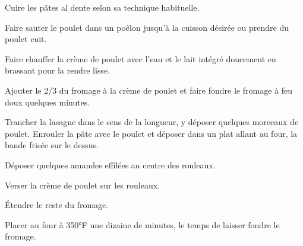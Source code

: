 \begin{steps}
    \item Cuire les pâtes al dente selon sa technique habituelle.
    \item Faire sauter le poulet dans un poêlon jusqu'à la cuisson désirée ou prendre du poulet cuit.
    \item Faire chauffer la crème de poulet avec l'eau et le lait intégré doucement en brassant pour la rendre lisse.
    \item Ajouter le 2/3 du fromage à la crème de poulet et faire fondre le fromage à feu doux quelques minutes.
    \item Trancher la lasagne dans le sens de la longueur, y déposer quelques morceaux de poulet. Enrouler la pâte avec le poulet et déposer dans un plat allant au four, la bande frisée sur le dessus.
    \item Déposer quelques amandes effilées au centre des rouleaux.
    \item Verser la crème de poulet sur les rouleaux.
    \item Étendre le reste du fromage.
    \item Placer au four à 350°F une dizaine de minutes, le temps de laisser fondre le fromage.
\end{steps}
